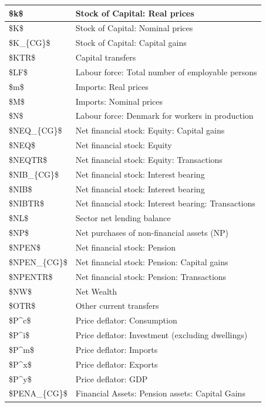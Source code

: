 \documentclass[
]{book}
\begin{document}
\begin{tabular}[t]{l|l}
\hline
\$k\$ & Stock of Capital: Real prices\\
\hline
\$K\$ & Stock of Capital: Nominal prices\\
\hline
\$K\_\{CG\}\$ & Stock of Capital: Capital gains\\
\hline
\$KTR\$ & Capital transfers\\
\hline
\$LF\$ & Labour force: Total number of employable persons\\
\hline
\$m\$ & Imports: Real prices\\
\hline
\$M\$ & Imports: Nominal prices\\
\hline
\$N\$ & Labour force: Denmark for workers in production\\
\hline
\$NEQ\_\{CG\}\$ & Net financial stock: Equity: Capital gains\\
\hline
\$NEQ\$ & Net financial stock: Equity\\
\hline
\$NEQTR\$ & Net financial stock: Equity: Transactions\\
\hline
\$NIB\_\{CG\}\$ & Net financial stock: Interest bearing\\
\hline
\$NIB\$ & Net financial stock: Interest bearing\\
\hline
\$NIBTR\$ & Net financial stock: Interest bearing: Transactions\\
\hline
\$NL\$ & Sector net lending balance\\
\hline
\$NP\$ & Net purchases of non-financial assets (NP)\\
\hline
\$NPEN\$ & Net financial stock: Pension\\
\hline
\$NPEN\_\{CG\}\$ & Net financial stock: Pension: Capital gains\\
\hline
\$NPENTR\$ & Net financial stock: Pension: Transactions\\
\hline
\$NW\$ & Net Wealth\\
\hline
\$OTR\$ & Other current transfers\\
\hline
\$P\textasciicircum{}c\$ & Price deflator: Consumption\\
\hline
\$P\textasciicircum{}i\$ & Price deflator: Investment (excluding dwellings)\\
\hline
\$P\textasciicircum{}m\$ & Price deflator: Imports\\
\hline
\$P\textasciicircum{}x\$ & Price deflator: Exports\\
\hline
\$P\textasciicircum{}y\$ & Price deflator: GDP\\
\hline
\$PENA\_\{CG\}\$ & Financial Assets: Pension assets: Capital Gains\\

\end{tabular}
\end{document}
